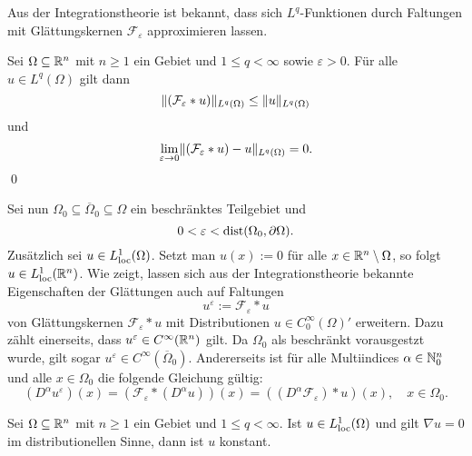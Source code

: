 Aus der Integrationstheorie ist bekannt, dass sich $L^q$-Funktionen durch Faltungen mit Glättungskernen $\mathcal{F}_\varepsilon$ approximieren lassen.

\begin{lem}
  \label{lem:mollification}
  Sei $\Omega \subseteq \mathbb{R}^n$ mit $n \geq 1$ ein Gebiet und $1 \leq q < \infty$ sowie $\varepsilon > 0$.
  Für alle $u \in L^q(\Omega)$ gilt dann
  $$
  \lVert (\mathcal{F}_\varepsilon \ast u) \rVert_{L^q(\Omega)} \leq  \lVert u \rVert_{L^q(\Omega)}
  $$
  und
  \begin{displaymath}
    \lim_{\varepsilon \to 0} \lVert (\mathcal{F}_\varepsilon \ast u) - u \rVert_{L^q(\Omega)} = 0. 
  \end{displaymath}
  \qed
\end{lem}

Sei nun $\Omega_0 \subseteq \overline\Omega_0 \subseteq \Omega$ ein beschränktes Teilgebiet und
\begin{equation}
  \label{eq:convolutionEpsilon}
  0 < \varepsilon < \operatorname{dist}(\Omega_0, \partial\Omega).
\end{equation}
Zusätzlich sei $u \in L^1_{\operatorname{loc}}(\Omega)$.
Setzt man $u(x) := 0$ für alle $x \in \mathbb{R}^n \setminus \Omega$, so folgt $u \in L^1_{\operatorname{loc}}(\mathbb{R}^n)$.
Wie \cite[S.171, Theorem 6.30(b)]{rudin1991fa} zeigt, lassen sich aus der Integrationstheorie bekannte Eigenschaften der Glättungen auch auf Faltungen 
$$
u^\varepsilon := \mathcal{F}_\varepsilon \ast u
$$
von Glättungskernen $\mathcal{F}_\varepsilon \ast u$ mit Distributionen $u \in C_0^\infty(\Omega)'$ erweitern.
Dazu zählt einerseits, dass $u^\varepsilon \in C^\infty(\mathbb{R}^n)$ gilt.
Da $\Omega_0$ als beschränkt vorausgestzt wurde, gilt sogar $u^\varepsilon \in C^\infty(\overline\Omega_0)$.
Andererseits ist für alle Multiindices $\alpha \in \mathbb{N}_0^n$ und alle $x \in \Omega_0$ die folgende Gleichung gültig:
\begin{equation}
  \label{eq:convolutionDiff}
  (D^\alpha u^\varepsilon)(x) 
  = (\mathcal{F}_\varepsilon \ast (D^\alpha u))(x)
  = ( (D^\alpha \mathcal{F}_\varepsilon) \ast u)(x), \quad x \in \Omega_0.
\end{equation}

\begin{lem}
  Sei $\Omega \subseteq \mathbb{R}^n$ mit $n \geq 1$ ein Gebiet und $1 \leq q < \infty$.
  Ist $u \in L^1_{\operatorname{loc}}(\Omega)$ und gilt $\nabla u = 0$ im distributionellen Sinne, dann ist $u$ konstant.
\end{lem}

